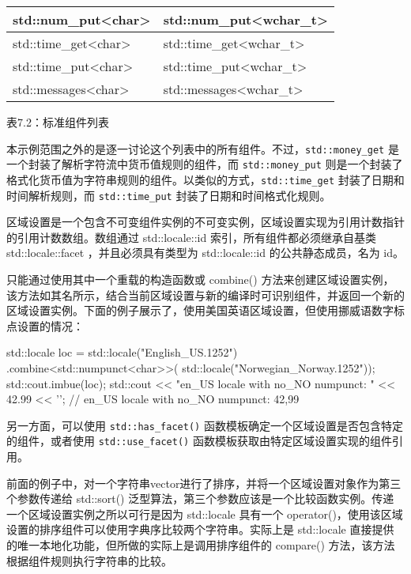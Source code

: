 \begin{longtable}{|l|l|}
std::num\_put\textless{}char\textgreater{}   & std::num\_put\textless{}wchar\_t\textgreater{}   \\ \hline
std::time\_get\textless{}char\textgreater{}  & std::time\_get\textless{}wchar\_t\textgreater{}  \\ \hline
std::time\_put\textless{}char\textgreater{}  & std::time\_put\textless{}wchar\_t\textgreater{}  \\ \hline
std::messages\textless{}char\textgreater{}   & std::messages\textless{}wchar\_t\textgreater{}   \\ \hline
\end{longtable}

\begin{center}
表7.2：标准组件列表
\end{center}

本示例范围之外的是逐一讨论这个列表中的所有组件。不过，\verb|std::money_get| 是一个封装了解析字符流中货币值规则的组件，而 \verb|std::money_put| 则是一个封装了格式化货币值为字符串规则的组件。以类似的方式，\verb|std::time_get| 封装了日期和时间解析规则，而 \verb|std::time_put| 封装了日期和时间格式化规则。

区域设置是一个包含不可变组件实例的不可变实例，区域设置实现为引用计数指针的引用计数数组。数组通过 std::locale::id 索引，所有组件都必须继承自基类 std::locale::facet ，并且必须具有类型为 std::locale::id 的公共静态成员，名为 id。

只能通过使用其中一个重载的构造函数或 combine() 方法来创建区域设置实例，该方法如其名所示，结合当前区域设置与新的编译时可识别组件，并返回一个新的区域设置实例。下面的例子展示了，使用美国英语区域设置，但使用挪威语数字标点设置的情况：

\begin{cpp}
std::locale loc = std::locale("English_US.1252")
                    .combine<std::numpunct<char>>(
                        std::locale("Norwegian_Norway.1252"));
std::cout.imbue(loc);
std::cout << "en_US locale with no_NO numpunct: " << 42.99 << '\n';
// en_US locale with no_NO numpunct: 42,99
\end{cpp}

另一方面，可以使用 \verb|std::has_facet()| 函数模板确定一个区域设置是否包含特定的组件，或者使用 \verb|std::use_facet()| 函数模板获取由特定区域设置实现的组件引用。

前面的例子中，对一个字符串vector进行了排序，并将一个区域设置对象作为第三个参数传递给 std::sort() 泛型算法，第三个参数应该是一个比较函数实例。传递一个区域设置实例之所以可行是因为 std::locale 具有一个 operator()，使用该区域设置的排序组件可以使用字典序比较两个字符串。实际上是 std::locale 直接提供的唯一本地化功能，但所做的实际上是调用排序组件的 compare() 方法，该方法根据组件规则执行字符串的比较。

